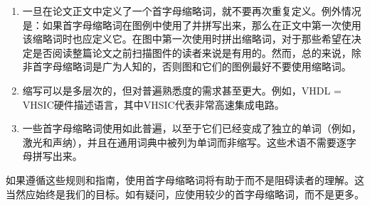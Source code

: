 \begin{enumerate}
\item 一旦在论文正文中定义了一个首字母缩略词，就不要再次重复定义。例外情况是：如果首字母缩略词在图例中使用了并拼写出来，那么在正文中第一次使用该缩略词时也应定义它。在图中第一次使用时拼出缩略词，对于那些希望在决定是否阅读整篇论文之前扫描图件的读者来说是有用的。然而，总的来说，除非首字母缩略词是广为人知的，否则图和它们的图例最好不要使用缩略词。

\item 缩写可以是多层次的，但对普遍熟悉度的需求甚至更大。例如，VHDL = VHSIC硬件描述语言，其中VHSIC代表非常高速集成电路。

\item 一些首字母缩略词使用如此普遍，以至于它们已经变成了独立的单词（例如，激光和声纳），并且在通用词典中被列为单词而非缩写。这些术语不需要逐字母拼写出来。

\end{enumerate}

如果遵循这些规则和指南，使用首字母缩略词将有助于而不是阻碍读者的理解。这当然应始终是我们的目标。如有疑问，应使用较少的首字母缩略词，而不是更多。


